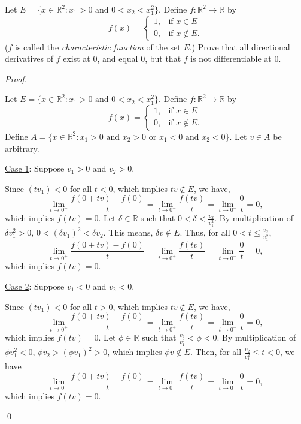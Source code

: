 \documentclass[12pt]{article}
\newenvironment{problem}[2][Problem]{\begin{trivlist}
\item[\hskip \labelsep {\bfseries #1}\hskip \labelsep {\bfseries
#2.}]}{\end{trivlist}}
\newenvironment{sol}
    {\emph{Proof.}
    }
    {
    \qed
    }
\begin{document}
  \begin{problem}{8} 
  Let $E = \{x \in \mathbb{R}^2 : x_1 > 0 \text{ and } 0 < x_2 < x_1^2\}$. Define $f : \mathbb{R}^2 \to \mathbb{R}$ by  $$f(x) = \begin{cases} 
       1, & \text{if } x \in E \\
        0, & \text{if } x \not\in E. 
     \end{cases}
  $$ ($f$ is called the \textit{characteristic function} of the set $E$.) Prove that all directional derivatives of $f$ exist at 0, and equal 0, but that $f$ is not differentiable at 0.
  \end{problem}
  \begin{sol}
  Let $E = \{x \in \mathbb{R}^2 : x_1 > 0 \text{ and } 0 < x_2 < x_1^2\}$. Define $f : \mathbb{R}^2 \to \mathbb{R}$ by  $$f(x) = \begin{cases} 
       1, & \text{if } x \in E \\
        0, & \text{if } x \not\in E. 
     \end{cases}
  $$ Define $A = \{x \in \mathbb{R}^2 : x_1 > 0 \text{ and } x_2 > 0 \text{ or } x_1 < 0 \text{ and } x_2 < 0\}$. Let $v \in A$ be arbitrary. 
  
  \vspace{1em}
  \noindent\underline{Case 1}: Suppose $v_1 > 0$ and $v_2 > 0$. 
  
  Since $(tv_1) < 0$ for all $t < 0$, which implies $tv \not\in E$, we have, $$\lim_{t \to 0^-} \frac{f(0 + tv) - f(0)}{t} = \lim_{t \to 0^-} \frac{f(tv)}{t} = \lim_{t \to 0^-} \frac{0}{t} = 0,$$ which implies $f(tv) = 0$. Let $\delta \in \mathbb{R}$ such that $0 < \delta < \frac{v_2}{v_1^2}$. By multiplication of $\delta v_1^2 > 0$, $0 < (\delta v_1)^2 < \delta v_2$. This means, $\delta v \not \in E$. Thus, for all $0 < t \leq \frac{v_2}{v_1^2}$, $$\lim_{t \to 0^+} \frac{f(0 + tv) - f(0)}{t} = \lim_{t \to 0^+} \frac{f(tv)}{t} = \lim_{t \to 0^+} \frac{0}{t} = 0,$$ which implies $f(tv) = 0$.
  
  \vspace{1em}
  \noindent\underline{Case 2}: Suppose $v_1 < 0$ and $v_2 < 0$. 
  
  Since $(tv_1) < 0$ for all $t > 0$, which implies $tv \not\in E$, we have, $$\lim_{t \to 0^+} \frac{f(0 + tv) - f(0)}{t} = \lim_{t \to 0^+} \frac{f(tv)}{t} = \lim_{t \to 0^+} \frac{0}{t} = 0,$$ which implies $f(tv) = 0$. Let $\phi \in \mathbb{R}$ such that $\frac{v_2}{v_1^2} < \phi < 0$. By multiplication of $\phi v_1^2 < 0$, $\phi v_2 > (\phi v_1)^2 > 0$, which implies $\phi v \not\in E$. Then, for all $\frac{v_2}{v_1^2} \leq t < 0$, we have $$\lim_{t \to 0^-} \frac{f(0 + tv) - f(0)}{t} = \lim_{t \to 0^-} \frac{f(tv)}{t} = \lim_{t \to 0^-} \frac{0}{t} = 0,$$ which implies $f(tv) = 0$.
  

\end{sol}
\end{document}
